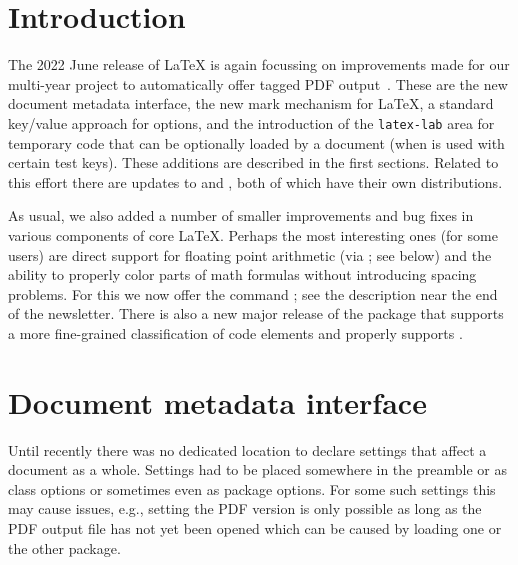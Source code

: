 \documentclass{ltnews}
\providecommand\tubcommand[1]{}
\begin{document}
\tubcommand{\addtolength\textheight{4.2pc}}   %

\maketitle
{  \spaceskip=3.33pt 
\tableofcontents}

\setlength{}


\medskip


\section{Introduction}

The 2022 June release of \LaTeX{} is again focussing on improvements
made for our multi-year project to automatically offer tagged PDF
output~\cite{35:blueprint}. These are the new document metadata
interface, the new mark mechanism for \LaTeX{}, a standard key/value
approach for options, and the introduction of the \texttt{latex-lab}
area for temporary code that can be optionally loaded by a document
(when  is used with certain test keys). These
additions are described in the first sections.  Related to this effort
there are updates to  and , both of which
have their own distributions.

As usual, we also added a number of smaller improvements and bug
fixes in various components of core \LaTeX{}. Perhaps the most
interesting ones (for some users) are direct support for floating
point arithmetic (via ; see below) and the ability to
properly color parts of math formulas without introducing spacing
problems. For this we now offer the command ; see the
description near the end of the newsletter.  There is also a new major
release of the  package that supports a more fine-grained
classification of code elements and properly supports .


\section{Document metadata interface}

Until recently there was no dedicated location to declare
settings that affect a document as a whole. Settings had to be placed
somewhere in the preamble or as class options or sometimes even as
package options. For some such settings this may cause issues, e.g.,
setting the PDF version is only possible as long as the PDF output
file has not yet been opened which can be caused by loading one or the
other package.
\end{document}
